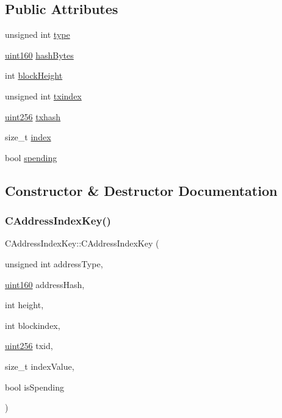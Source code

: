 \subsection*{Public Attributes}
\begin{DoxyCompactItemize}
\item 
unsigned int \mbox{\hyperlink{struct_c_address_index_key_a4334d32bb8e25f06a66c1468278fa661}{type}}
\item 
\mbox{\hyperlink{classuint160}{uint160}} \mbox{\hyperlink{struct_c_address_index_key_a373b7ccb312da3b25c57a56ee92ac150}{hash\+Bytes}}
\item 
int \mbox{\hyperlink{struct_c_address_index_key_a0fd581d2055e6d0a3ffb2b57ad99fd92}{block\+Height}}
\item 
unsigned int \mbox{\hyperlink{struct_c_address_index_key_ac95b9f75bf63e62eb2018f20caac3b72}{txindex}}
\item 
\mbox{\hyperlink{classuint256}{uint256}} \mbox{\hyperlink{struct_c_address_index_key_aa54b421311b483ac6e3ee6581346854c}{txhash}}
\item 
size\+\_\+t \mbox{\hyperlink{struct_c_address_index_key_a520be02622fbc68070543d05b3f6e867}{index}}
\item 
bool \mbox{\hyperlink{struct_c_address_index_key_a7538f16defec54ae64064a500f47a55a}{spending}}
\end{DoxyCompactItemize}


\subsection{Constructor \& Destructor Documentation}
\mbox{\label{struct_c_address_index_key_a2bea7cb1a2c2c82968e1868dbb748f01}} 
\subsubsection{\texorpdfstring{C\+Address\+Index\+Key()}{CAddressIndexKey()}\hspace{0.1cm}{\footnotesize\ttfamily [1/2]}}
{\footnotesize\ttfamily C\+Address\+Index\+Key\+::\+C\+Address\+Index\+Key (\begin{DoxyParamCaption}\item[{unsigned int}]{address\+Type,  }\item[{\mbox{\hyperlink{classuint160}{uint160}}}]{address\+Hash,  }\item[{int}]{height,  }\item[{int}]{blockindex,  }\item[{\mbox{\hyperlink{classuint256}{uint256}}}]{txid,  }\item[{size\+\_\+t}]{index\+Value,  }\item[{bool}]{is\+Spending }\end{DoxyParamCaption})\hspace{0.3cm}{\ttfamily [inline]}}

